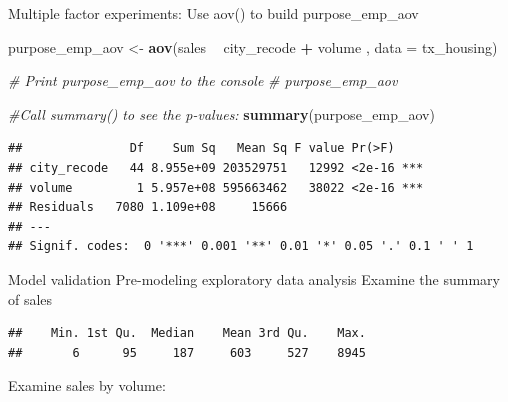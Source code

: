 \documentclass[]{book}
\newenvironment{Shaded}{\begin{snugshade}}{\end{snugshade}}
\newcommand{\CommentTok}[1]{\textcolor[rgb]{0.56,0.35,0.01}{\textit{#1}}}
\newcommand{\DataTypeTok}[1]{\textcolor[rgb]{0.13,0.29,0.53}{#1}}
\newcommand{\KeywordTok}[1]{\textcolor[rgb]{0.13,0.29,0.53}{\textbf{#1}}}
\newcommand{\NormalTok}[1]{#1}
\newcommand{\OperatorTok}[1]{\textcolor[rgb]{0.81,0.36,0.00}{\textbf{#1}}}
\newcommand{\StringTok}[1]{\textcolor[rgb]{0.31,0.60,0.02}{#1}}
\begin{document}
Multiple factor experiments:
Use aov() to build purpose\_emp\_aov

\begin{Shaded}
\begin{Highlighting}[]
\NormalTok{purpose_emp_aov <-}\StringTok{ }\KeywordTok{aov}\NormalTok{(sales }\OperatorTok{~}\StringTok{ }\NormalTok{city_recode }\OperatorTok{+}\StringTok{ }\NormalTok{volume , }\DataTypeTok{data =}\NormalTok{ tx_housing)}

\CommentTok{# Print purpose_emp_aov to the console}
\CommentTok{# purpose_emp_aov}

\CommentTok{#Call summary() to see the p-values:}
\KeywordTok{summary}\NormalTok{(purpose_emp_aov)}
\end{Highlighting}
\end{Shaded}

\begin{verbatim}
##               Df    Sum Sq   Mean Sq F value Pr(>F)    
## city_recode   44 8.955e+09 203529751   12992 <2e-16 ***
## volume         1 5.957e+08 595663462   38022 <2e-16 ***
## Residuals   7080 1.109e+08     15666                   
## ---
## Signif. codes:  0 '***' 0.001 '**' 0.01 '*' 0.05 '.' 0.1 ' ' 1
\end{verbatim}

Model validation
Pre-modeling exploratory data analysis
Examine the summary of sales

\begin{Shaded}
\end{Shaded}

\begin{verbatim}
##    Min. 1st Qu.  Median    Mean 3rd Qu.    Max. 
##       6      95     187     603     527    8945
\end{verbatim}

Examine sales by volume:

\begin{Shaded}
\end{Shaded}
\end{document}
